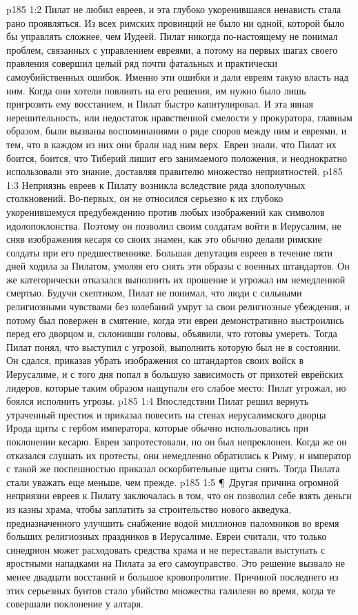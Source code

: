 \vs p185 1:2 Пилат не любил евреев, и эта глубоко укоренившаяся ненависть стала рано проявляться. Из всех римских провинций не было ни одной, которой было бы управлять сложнее, чем Иудеей. Пилат никогда по\hyp{}настоящему не понимал проблем, связанных с управлением евреями, а потому на первых шагах своего правления совершил целый ряд почти фатальных и практически самоубийственных ошибок. Именно эти ошибки и дали евреям такую власть над ним. Когда они хотели повлиять на его решения, им нужно было лишь пригрозить ему восстанием, и Пилат быстро капитулировал. И эта явная нерешительность, или недостаток нравственной смелости у прокуратора, главным образом, были вызваны воспоминаниями о ряде споров между ним и евреями, и тем, что в каждом из них они брали над ним верх. Евреи знали, что Пилат их боится, боится, что Тиберий лишит его занимаемого положения, и неоднократно использовали это знание, доставляя правителю множество неприятностей.
\vs p185 1:3 Неприязнь евреев к Пилату возникла вследствие ряда злополучных столкновений. Во\hyp{}первых, он не относился серьезно к их глубоко укоренившемуся предубеждению против любых изображений как символов идолопоклонства. Поэтому он позволил своим солдатам войти в Иерусалим, не сняв изображения кесаря со своих знамен, как это обычно делали римские солдаты при его предшественнике. Большая депутация евреев в течение пяти дней ходила за Пилатом, умоляя его снять эти образы с военных штандартов. Он же категорически отказался выполнить их прошение и угрожал им немедленной смертью. Будучи скептиком, Пилат не понимал, что люди с сильными религиозными чувствами без колебаний умрут за свои религиозные убеждения, и потому был повержен в смятение, когда эти евреи демонстративно выстроились перед его дворцом и, склонивши головы, объявили, что готовы умереть. Тогда Пилат понял, что выступил с угрозой, выполнить которую был не в состоянии. Он сдался, приказав убрать изображения со штандартов своих войск в Иерусалиме, и с того дня попал в большую зависимость от прихотей еврейских лидеров, которые таким образом нащупали его слабое место: Пилат угрожал, но боялся исполнить угрозы.
\vs p185 1:4 Впоследствии Пилат решил вернуть утраченный престиж и приказал повесить на стенах иерусалимского дворца Ирода щиты с гербом императора, которые обычно использовались при поклонении кесарю. Евреи запротестовали, но он был непреклонен. Когда же он отказался слушать их протесты, они немедленно обратились к Риму, и император с такой же поспешностью приказал оскорбительные щиты снять. Тогда Пилата стали уважать еще меньше, чем прежде.
\vs p185 1:5 \P\ Другая причина огромной неприязни евреев к Пилату заключалась в том, что он позволил себе взять деньги из казны храма, чтобы заплатить за строительство нового акведука, предназначенного улучшить снабжение водой миллионов паломников во время больших религиозных праздников в Иерусалиме. Евреи считали, что только синедрион может расходовать средства храма и не переставали выступать с яростными нападками на Пилата за его самоуправство. Это решение вызвало не менее двадцати восстаний и большое кровопролитие. Причиной последнего из этих серьезных бунтов стало убийство множества галилеян во время, когда те совершали поклонение у алтаря.
